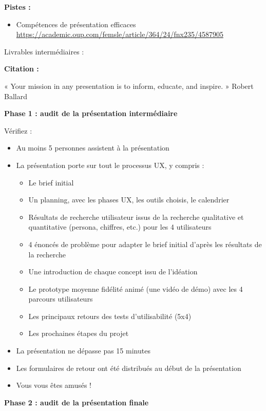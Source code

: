 \textbf{Pistes :}

\begin{itemize}
\item Compétences de présentation efficaces \url{https://academic.oup.com/femsle/article/364/24/fnx235/4587905}
\end{itemize}

Livrables intermédiaires :

\textbf{Citation :}

« Your mission in any presentation is to inform, educate, and inspire. » Robert Ballard

\medskip

\textbf{Phase 1 : audit de la présentation intermédiaire}

Vérifiez :

\begin{itemize}
\item Au moins 5 personnes assistent à la présentation
\item La présentation porte sur tout le processus UX, y compris :
\begin{itemize}
\item Le brief initial
\item Un planning, avec les phases UX, les outils choisis, le calendrier
\item Résultats de recherche utilisateur issus de la recherche qualitative et quantitative (persona, chiffres, etc.) pour les 4 utilisateurs
\item 4 énoncés de problème pour adapter le brief initial d'après les résultats de la recherche
\item Une introduction de chaque concept issu de l'idéation
\item Le prototype moyenne fidélité animé (une vidéo de démo) avec les 4 parcours utilisateurs
\item Les principaux retours des tests d'utilisabilité (5x4)
\item Les prochaines étapes du projet
\end{itemize}
\item La présentation ne dépasse pas 15 minutes
\item Les formulaires de retour ont été distribués au début de la présentation
\item Vous vous êtes amusés !
\end{itemize}

\medskip

\textbf{Phase 2 : audit de la présentation finale}

